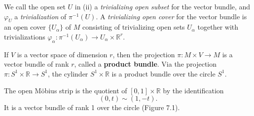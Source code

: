 \begin{definition}[Trivialization] 
    We call the open set $U$ in (ii) a \emph{trivializing open subset} for the vector bundle, and $\varphi_U$ a \emph{trivialization} of $\pi^{-1}(U)$. A \emph{trivializing open cover} for the vector bundle is an open cover $\{U_\alpha\}$ of $M$ consisting of trivializing open sets $U_\alpha$ together with trivializations $\varphi_\alpha : \pi^{-1}(U_\alpha) \to U_\alpha \times \mathbb{R}^r$.
\end{definition}

\begin{example}
If $V$ is a vector space of dimension $r$, then the projection $\pi : M \times V \to M$ is a vector bundle of rank $r$, called a \textbf{product bundle}. Via the projection $\pi : S^1 \times \mathbb{R} \to S^1$, the cylinder $S^1 \times \mathbb{R}$ is a product bundle over the circle $S^1$.
\end{example}

\begin{example}
The open M\"obius strip is the quotient of $[0,1] \times \mathbb{R}$ by the identification
\[
(0,t) \sim (1,-t).
\]
It is a vector bundle of rank 1 over the circle (Figure 7.1).

\end{example}

